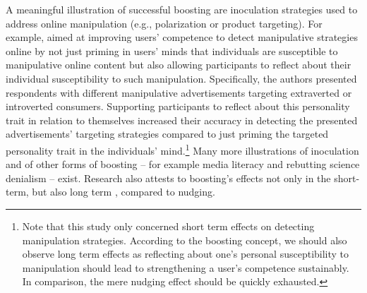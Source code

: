 \documentclass[reflection, authordate]{jote-new-article}
\begin{document}
A meaningful illustration of successful boosting are inoculation strategies used to address online manipulation (e.g., polarization or product targeting). For example, \textcite{Lorenz-Spreen2021} aimed at improving users’ competence to detect manipulative strategies online by not just priming in users’ minds that individuals are susceptible to manipulative online content but also allowing participants to reflect about their individual susceptibility to such manipulation. Specifically, the authors presented respondents with different manipulative advertisements targeting extraverted or introverted consumers. Supporting participants to reflect about this personality trait in relation to themselves increased their accuracy in detecting the presented advertisements’ targeting strategies compared to just priming the targeted personality trait in the individuals’ mind.\footnote{ Note that this study only concerned short term effects on detecting manipulation strategies. According to the boosting concept, we should also observe long term effects as reflecting about one’s personal susceptibility to manipulation should lead to strengthening a user’s competence sustainably. In comparison, the mere nudging effect should be quickly exhausted.} Many more illustrations of inoculation \parencites[e.g., as digital games][]{Basol2020}{HarropND} and of other forms of boosting – for example media literacy \parencites{Guess2020} and rebutting science denialism \parencites{Schmid2019} – exist. Research also attests to boosting’s effects not only in the short-term, but also long term \parencites[e.g.][]{Maertens2021}, compared to nudging.
\end{document}
